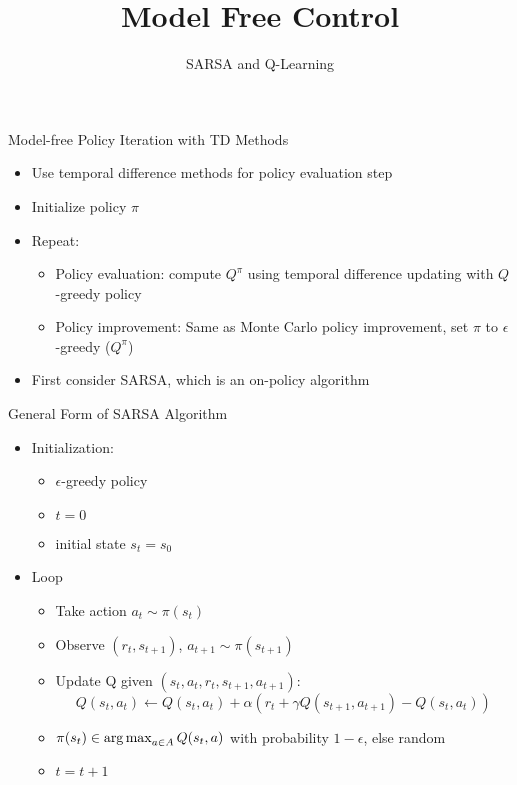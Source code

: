 \documentclass[aspectratio=169]{../latex_main/tntbeamer}  %
\title[RL: Model Free Control]{Model Free Control}
\subtitle{SARSA and Q-Learning}
\begin{document}
	
	\maketitle

\begin{frame}[c]{Model-free Policy Iteration with TD Methods}
	
	\begin{itemize}
		\item Use temporal difference methods for policy evaluation step
		\item Initialize policy $\pi$
		\item Repeat:
		\begin{itemize}
			\item Policy evaluation: compute $Q^\pi$ using temporal difference updating
			with $Q$-greedy policy
			\item Policy improvement: Same as Monte Carlo policy improvement, set $\pi$
			to $\epsilon$-greedy ($Q^\pi$)
		\end{itemize}
		\item First consider SARSA, which is an on-policy algorithm
	\end{itemize}
	
\end{frame}
\begin{frame}[c]{General Form of SARSA Algorithm}
	
	\begin{itemize}
		\item Initialization:
		\begin{itemize}
			\item $\epsilon$-greedy policy 
			\item $t=0$
			\item initial state $s_t = s_0$
		\end{itemize} 
		\item Loop
		\begin{itemize}
			\item Take action $a_t \sim \pi(s_t)$
			\item Observe $(r_t, s_{t+1})$, $a_{t+1} \sim \pi(s_{t+1})$
			\item Update Q given $(s_t, a_t, r_t, s_{t+1}, a_{t+1})$:
			$$Q(s_t,a_t) \gets Q(s_t, a_t) + \alpha (r_t + \gamma Q(s_{t+1}, a_{t+1}) - Q(s_t, a_t))$$
			\item $\pi(s_t) \in \operatorname*{arg\,max}_{a\in A} Q(s_t, a)$ with probability $1-\epsilon$, else random
			\item $t = t+1$
		\end{itemize} 
	\end{itemize}
	
\end{frame}
\end{document}
